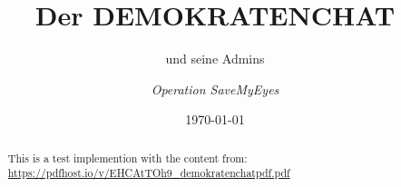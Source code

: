 \documentclass[12pt,oneside,a4paper,ngerman]{article}
\title{%
  Der DEMOKRATENCHAT
}%
\subtitle{%
  und seine Admins
}%
\author{\small{\textit{Operation SaveMyEyes}}}
\date{\today}
\begin{document}
  
  \begin{abstract}
     This is a test implemention with the content from: \url{https://pdfhost.io/v/EHCAtTOh9_demokratenchatpdf.pdf}
  \end{abstract}
  
  
  
\end{document}

